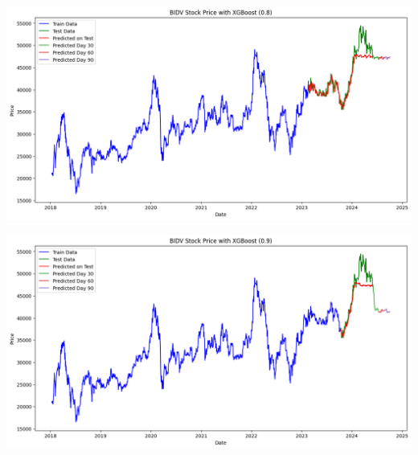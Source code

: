\documentclass[conference]{IEEEtran}
\begin{document}
\begin{minipage}{0.23\textwidth}
    \centering
    \includegraphics[width=\linewidth]{images/XGBoost/XGBoost_BIDV_82.png}
    \label{fig:image1}
\end{minipage}
\hfill
\begin{minipage}{0.23\textwidth}
    \centering
    \includegraphics[width=\linewidth]{images/XGBoost/XGBoost_BIDV_91.png}
    \label{fig:image2}
\end{minipage}
\end{document}
